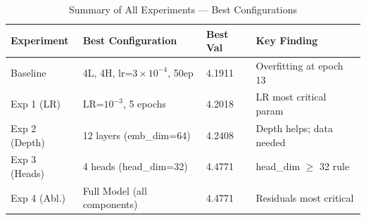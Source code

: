 \documentclass[12pt,a4paper]{article}
\begin{document}
\begin{table}[H]
\centering
\caption{Summary of All Experiments — Best Configurations}
\renewcommand{\arraystretch}{1.4}
\begin{tabular}{L{3cm}L{4.5cm}C{2.2cm}L{3.5cm}}
  \toprule
  \textbf{Experiment} & \textbf{Best Configuration} & \textbf{Best Val} & \textbf{Key Finding} \\
  \midrule
  Baseline      & 4L, 4H, lr=$3\times10^{-4}$, 50ep     & 4.1911 & Overfitting at epoch 13 \\
  Exp 1 (LR)    & LR=$10^{-3}$, 5 epochs                 & 4.2018 & LR most critical param \\
  Exp 2 (Depth) & 12 layers (emb\_dim=64)                & 4.2408 & Depth helps; data needed \\
  Exp 3 (Heads) & 4 heads (head\_dim=32)                 & 4.4771 & head\_dim $\geq$ 32 rule \\
  Exp 4 (Abl.)  & Full Model (all components)            & 4.4771 & Residuals most critical \\
  \bottomrule
\end{tabular}
\end{table}
\end{document}

